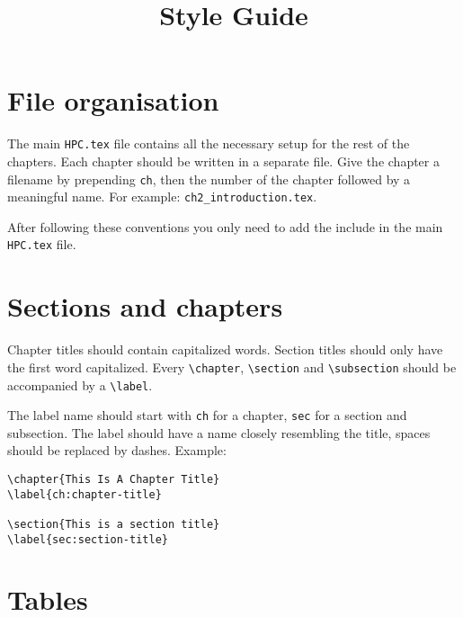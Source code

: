 \documentclass[11pt,a4paper]{article}
\title{Style Guide}
\begin{document}
\maketitle

\section{File organisation}
\label{sec:file-organisation}

The main \texttt{HPC.tex} file contains all the necessary setup for the rest of
the chapters. Each chapter should be written in a separate file. Give the
chapter a filename by prepending \texttt{ch}, then the number of the chapter
followed by a meaningful name. For example: \texttt{ch2\_introduction.tex}.

After following these conventions you only need to add the include in the main
\texttt{HPC.tex} file.

\section{Sections and chapters}
\label{sec:sections-and-chapters}

Chapter titles should contain capitalized words. Section titles should only
have the first word capitalized. Every \texttt{\textbackslash{}chapter},
\texttt{\textbackslash{}section} and \texttt{\textbackslash{}subsection} should
be accompanied by a \texttt{\textbackslash{}label}.

The label name should start with \texttt{ch} for a chapter, \texttt{sec} for a
section and subsection. The label should have a name closely resembling the
title, spaces should be replaced by dashes. Example:

\begin{verbatim}
\chapter{This Is A Chapter Title}
\label{ch:chapter-title}

\section{This is a section title}
\label{sec:section-title}
\end{verbatim}

\section{Tables}
\label{sec:tables}
\end{document}
